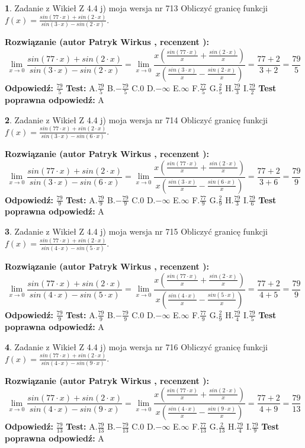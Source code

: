 \documentclass[12pt, a4paper]{article}
\theoremstyle{definition} %
\newtheorem{zad}{}
\newcommand{\zadStart}[1]{\begin{zad}#1\newline}
\newcommand{\zadStop}{\end{zad}}
\newcommand{\rozwStart}[2]{\noindent \textbf{Rozwiązanie (autor #1 , recenzent #2): }\newline}
\newcommand{\rozwStop}{\newline}
\newcommand{\odpStart}{\noindent \textbf{Odpowiedź:}\newline}
\newcommand{\odpStop}{\newline}
\newcommand{\testStart}{\noindent \textbf{Test:}\newline}
\newcommand{\testStop}{\newline}
\newcommand{\kluczStart}{\noindent \textbf{Test poprawna odpowiedź:}\newline}
\newcommand{\kluczStop}{\newline}
\begin{document}
\zadStart{Zadanie z Wikieł Z 4.4 j) moja wersja nr 713}
Obliczyć granicę funkcji $f(x)=\frac{sin(77\cdot x) +sin(2\cdot x)}{sin(3\cdot x) -sin(2\cdot x)}$.
\zadStop
\rozwStart{Patryk Wirkus}{}
$$\lim\limits_{x\to 0}\frac{sin(77\cdot x) +sin(2\cdot x)}{sin(3\cdot x) -sin(2\cdot x)}=\lim\limits_{x\to 0}\frac{x(\frac{sin(77\cdot x)}{x}+\frac{sin(2\cdot x)}{x})}{x(\frac{sin(3\cdot x)}{x}-\frac{sin(2\cdot x)}{x})}=\frac{77+2}{3+2} = \frac{79}{5}$$
\rozwStop
\odpStart
$\frac{79}{5}$
\odpStop
\testStart
A.$\frac{79}{5}$
B.$-\frac{79}{5}$
C.$0$
D.$-\infty$
E.$\infty$
F.$\frac{77}{5}$
G.$\frac{2}{5}$
H.$\frac{79}{3}$
I.$\frac{79}{2}$
\testStop
\kluczStart
A
\kluczStop



\zadStart{Zadanie z Wikieł Z 4.4 j) moja wersja nr 714}
Obliczyć granicę funkcji $f(x)=\frac{sin(77\cdot x) +sin(2\cdot x)}{sin(3\cdot x) -sin(6\cdot x)}$.
\zadStop
\rozwStart{Patryk Wirkus}{}
$$\lim\limits_{x\to 0}\frac{sin(77\cdot x) +sin(2\cdot x)}{sin(3\cdot x) -sin(6\cdot x)}=\lim\limits_{x\to 0}\frac{x(\frac{sin(77\cdot x)}{x}+\frac{sin(2\cdot x)}{x})}{x(\frac{sin(3\cdot x)}{x}-\frac{sin(6\cdot x)}{x})}=\frac{77+2}{3+6} = \frac{79}{9}$$
\rozwStop
\odpStart
$\frac{79}{9}$
\odpStop
\testStart
A.$\frac{79}{9}$
B.$-\frac{79}{9}$
C.$0$
D.$-\infty$
E.$\infty$
F.$\frac{77}{9}$
G.$\frac{2}{9}$
H.$\frac{79}{3}$
I.$\frac{79}{6}$
\testStop
\kluczStart
A
\kluczStop



\zadStart{Zadanie z Wikieł Z 4.4 j) moja wersja nr 715}
Obliczyć granicę funkcji $f(x)=\frac{sin(77\cdot x) +sin(2\cdot x)}{sin(4\cdot x) -sin(5\cdot x)}$.
\zadStop
\rozwStart{Patryk Wirkus}{}
$$\lim\limits_{x\to 0}\frac{sin(77\cdot x) +sin(2\cdot x)}{sin(4\cdot x) -sin(5\cdot x)}=\lim\limits_{x\to 0}\frac{x(\frac{sin(77\cdot x)}{x}+\frac{sin(2\cdot x)}{x})}{x(\frac{sin(4\cdot x)}{x}-\frac{sin(5\cdot x)}{x})}=\frac{77+2}{4+5} = \frac{79}{9}$$
\rozwStop
\odpStart
$\frac{79}{9}$
\odpStop
\testStart
A.$\frac{79}{9}$
B.$-\frac{79}{9}$
C.$0$
D.$-\infty$
E.$\infty$
F.$\frac{77}{9}$
G.$\frac{2}{9}$
H.$\frac{79}{4}$
I.$\frac{79}{5}$
\testStop
\kluczStart
A
\kluczStop



\zadStart{Zadanie z Wikieł Z 4.4 j) moja wersja nr 716}
Obliczyć granicę funkcji $f(x)=\frac{sin(77\cdot x) +sin(2\cdot x)}{sin(4\cdot x) -sin(9\cdot x)}$.
\zadStop
\rozwStart{Patryk Wirkus}{}
$$\lim\limits_{x\to 0}\frac{sin(77\cdot x) +sin(2\cdot x)}{sin(4\cdot x) -sin(9\cdot x)}=\lim\limits_{x\to 0}\frac{x(\frac{sin(77\cdot x)}{x}+\frac{sin(2\cdot x)}{x})}{x(\frac{sin(4\cdot x)}{x}-\frac{sin(9\cdot x)}{x})}=\frac{77+2}{4+9} = \frac{79}{13}$$
\rozwStop
\odpStart
$\frac{79}{13}$
\odpStop
\testStart
A.$\frac{79}{13}$
B.$-\frac{79}{13}$
C.$0$
D.$-\infty$
E.$\infty$
F.$\frac{77}{13}$
G.$\frac{2}{13}$
H.$\frac{79}{4}$
I.$\frac{79}{9}$
\testStop
\kluczStart
A
\kluczStop
\end{document}
